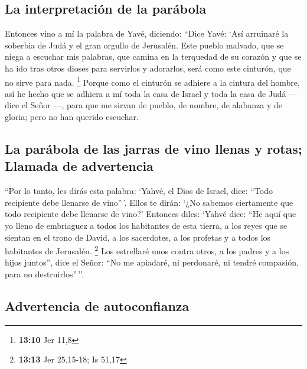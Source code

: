 \begin{paracol}{2}
\hypertarget{la-interpretaciuxf3n-de-la-paruxe1bola}{%
\subsection{La interpretación de la
parábola}\label{la-interpretaciuxf3n-de-la-paruxe1bola}}

 Entonces vino a mí la palabra de Yavé, diciendo:
 ``Dice Yavé: `Así arruinaré la soberbia de Judá y el gran
orgullo de Jerusalén.  Este pueblo malvado, que se niega
a escuchar mis palabras, que camina en la terquedad de su corazón y que
se ha ido tras otros dioses para servirlos y adorarlos, será como este
cinturón, que no sirve para nada. \footnote{\textbf{13:10} Jer 11,8}
 Porque como el cinturón se adhiere a la cintura del
hombre, así he hecho que se adhiera a mí toda la casa de Israel y toda
la casa de Judá --- dice el Señor ---, para que me sirvan de pueblo, de
nombre, de alabanza y de gloria; pero no han querido escuchar.

\hypertarget{la-paruxe1bola-de-las-jarras-de-vino-llenas-y-rotas-llamada-de-advertencia}{%
\subsection{La parábola de las jarras de vino llenas y rotas; Llamada de
advertencia}\label{la-paruxe1bola-de-las-jarras-de-vino-llenas-y-rotas-llamada-de-advertencia}}

 ``Por lo tanto, les dirás esta palabra: `Yahvé, el Dios
de Israel, dice: ``Todo recipiente debe llenarse de vino''\,'. Ellos te
dirán: `¿No sabemos ciertamente que todo recipiente debe llenarse de
vino?'  Entonces diles: `Yahvé dice: ``He aquí que yo
lleno de embriaguez a todos los habitantes de esta tierra, a los reyes
que se sientan en el trono de David, a los sacerdotes, a los profetas y
a todos los habitantes de Jerusalén. \footnote{\textbf{13:13} Jer
  25,15-18; Is 51,17}  Los estrellaré unos contra otros,
a los padres y a los hijos juntos'', dice el Señor: ``No me apiadaré, ni
perdonaré, ni tendré compasión, para no destruirlos''\,''.

\hypertarget{advertencia-de-autoconfianza}{%
\subsection{Advertencia de
autoconfianza}\label{advertencia-de-autoconfianza}}


\end{paracol}
